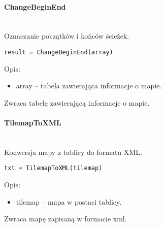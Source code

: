 \paragraph{ChangeBeginEnd} \hspace{0pt} \\
Oznaczanie początków i końców ścieżek.
\begin{lstlisting}[style=Matlab-editor]
result = ChangeBeginEnd(array)
\end{lstlisting}

Opis:
\begin{itemize}
\item  array -- tabela zawierająca informacje o mapie.
\end{itemize}

Zwraca tabelę zawierającą informacje o mapie.

\paragraph{TilemapToXML} \hspace{0pt} \\
Konwersja mapy z tablicy do formatu XML.
\begin{lstlisting}[style=Matlab-editor]
txt = TilemapToXML(tilemap)
\end{lstlisting}

Opis:
\begin{itemize}
\item  tilemap -- mapa w postaci tablicy.
\end{itemize}

Zwraca mapę zapisaną w formacie xml.


